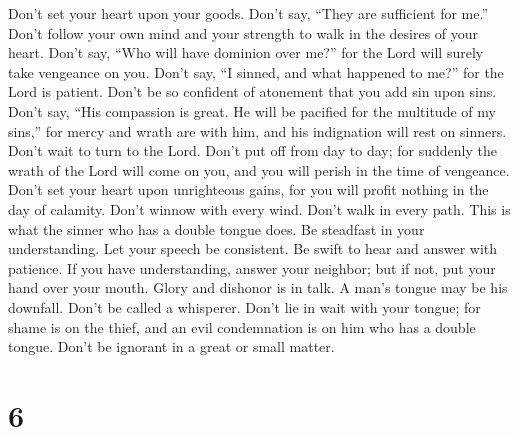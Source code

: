  Don't set your heart upon your goods. Don't say, ``They are
sufficient for me.''  Don't follow your own mind and your
strength to walk in the desires of your heart.  Don't say,
``Who will have dominion over me?'' for the Lord will surely take
vengeance on you.  Don't say, ``I sinned, and what happened
to me?'' for the Lord is patient.  Don't be so confident of
atonement that you add sin upon sins.  Don't say, ``His
compassion is great. He will be pacified for the multitude of my sins,''
for mercy and wrath are with him, and his indignation will rest on
sinners.  Don't wait to turn to the Lord. Don't put off from
day to day; for suddenly the wrath of the Lord will come on you, and you
will perish in the time of vengeance.  Don't set your heart
upon unrighteous gains, for you will profit nothing in the day of
calamity.  Don't winnow with every wind. Don't walk in every
path. This is what the sinner who has a double tongue does.
 Be steadfast in your understanding. Let your speech be
consistent.  Be swift to hear and answer with patience.
 If you have understanding, answer your neighbor; but if
not, put your hand over your mouth.  Glory and dishonor is
in talk. A man's tongue may be his downfall.  Don't be
called a whisperer. Don't lie in wait with your tongue; for shame is on
the thief, and an evil condemnation is on him who has a double tongue.
 Don't be ignorant in a great or small matter.

\hypertarget{section-2}{%
\section{6}\label{section-2}}

